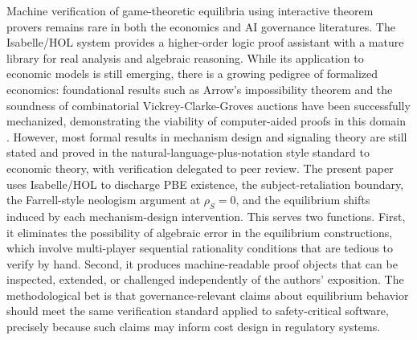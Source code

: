 Machine verification of game-theoretic equilibria using interactive theorem provers remains rare in both the economics and AI governance literatures. The Isabelle/HOL system \citep{nipkow2002isabelle} provides a higher-order logic proof assistant with a mature library for real analysis and algebraic reasoning. While its application to economic models is still emerging, there is a growing pedigree of formalized economics: foundational results such as Arrow's impossibility theorem \citep{nipkow_arrows_thm2009} and the soundness of combinatorial Vickrey-Clarke-Groves auctions \citep{caminati_kerber_lange_rowat_vcg2015} have been successfully mechanized, demonstrating the viability of computer-aided proofs in this domain \citep{kerber_lange_rowat_intro2016}. However, most formal results in mechanism design and signaling theory are still stated and proved in the natural-language-plus-notation style standard to economic theory, with verification delegated to peer review. The present paper uses Isabelle/HOL to discharge PBE existence, the subject-retaliation boundary, the Farrell-style neologism argument at $\rho_S=0$, and the equilibrium shifts induced by each mechanism-design intervention. This serves two functions. First, it eliminates the possibility of algebraic error in the equilibrium constructions, which involve multi-player sequential rationality conditions that are tedious to verify by hand. Second, it produces machine-readable proof objects that can be inspected, extended, or challenged independently of the authors' exposition. The methodological bet is that governance-relevant claims about equilibrium behavior should meet the same verification standard applied to safety-critical software, precisely because such claims may inform cost design in regulatory systems.
